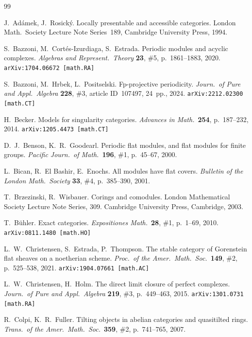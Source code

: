 \documentclass[12pt,a4paper]{amsart}
\newcommand{\+}{\nobreakdash-}
\renewcommand{\:}{\colon}
\theoremstyle{plain}
\theoremstyle{definition}
\begin{document}
\bigskip
\begin{thebibliography}{99}
\smallskip

 J.~Ad\'amek, J.~Rosick\'y.
   Locally presentable and accessible categories.
London Math.\ Society Lecture Note Series~189,
Cambridge University Press, 1994.

 S.~Bazzoni, M.~Cort\'es-Izurdiaga, S.~Estrada.
   Periodic modules and acyclic complexes.
\textit{Algebras and Represent.\ Theory} \textbf{23}, \#5,
p.~1861--1883, 2020.  	\texttt{arXiv:1704.06672 [math.RA]}

 S.~Bazzoni, M.~Hrbek, L.~Positselski.
   Fp\+projective periodicity.
\textit{Journ.\ of Pure and Appl.\ Algebra} \textbf{228}, \#3,
article ID~107497, 24~pp., 2024.  \texttt{arXiv:2212.02300 [math.CT]}

 H.~Becker.
   Models for singularity categories.
\textit{Advances in Math.}\ \textbf{254}, p.~187--232, 2014.
\texttt{arXiv:1205.4473 [math.CT]}

 D.~J.~Benson, K.~R.~Goodearl.
   Periodic flat modules, and flat modules for finite groups.
\textit{Pacific Journ.\ of Math.}\ \textbf{196}, \#1, p.~45--67, 2000.

 L.~Bican, R.~El Bashir, E.~Enochs.
   All modules have flat covers.
\textit{Bulletin of the London Math.\ Society} \textbf{33}, \#4,
p.~385--390, 2001.

 T.~Brzezinski, R.~Wisbauer.
   Corings and comodules.
London Mathematical Society Lecture Note Series, 309.
Cambridge University Press, Cambridge, 2003.

 T.~B\"uhler.
   Exact categories.
\textit{Expositiones Math.}\ \textbf{28}, \#1, p.~1--69, 2010.
\texttt{arXiv:0811.1480 [math.HO]}

 L.~W.~Christensen, S.~Estrada, P.~Thompson.
   The stable category of Gorenstein flat sheaves on a noetherian
scheme.
\textit{Proc.\ of the Amer.\ Math.\ Soc.}\ \textbf{149}, \#2,
p.~525--538, 2021.  \texttt{arXiv:1904.07661 [math.AC]}

 L.~W.~Christensen, H.~Holm.
   The direct limit closure of perfect complexes.
\textit{Journ.\ of Pure and Appl.\ Algebra} \textbf{219}, \#3,
p.~449--463, 2015.  \texttt{arXiv:1301.0731 [math.RA]}

 R.~Colpi, K.~R.~Fuller.
   Tilting objects in abelian categories and quasitilted rings.
\textit{Trans.\ of the Amer.\ Math.\ Soc.}\ \textbf{359}, \#2,
p.~741--765, 2007.


\end{thebibliography}
\end{document}
